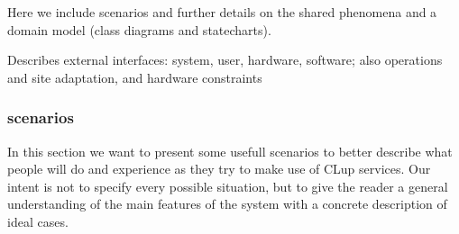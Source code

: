 Here we include scenarios and further details on the shared phenomena and a domain model (class diagrams and statecharts).

Describes external interfaces: system, user, hardware, software; also operations and site adaptation, and hardware constraints

\subsubsection{scenarios}
\label{subsubsect:scenarios}

In this section we want to present some usefull scenarios to better describe what people will do and experience as they try to make use of CLup services. Our intent is not to specify every possible situation, but to give the reader a general understanding of the main features of the system with a concrete description of ideal cases.
 
